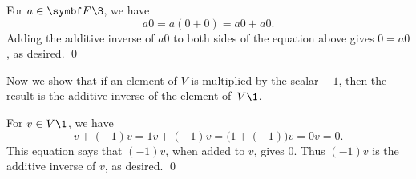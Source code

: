 
\proof
For $a \in \F{}\3$, we have
\[
a0 = a(0 + 0) = a0 + a0.
\]
Adding the additive inverse of $a0$ to both sides of the equation above gives
$0 = a0$, as desired.
\qed

Now we show that if an element of $V$ is multiplied by the
scalar~$-1$, then the result is the
additive inverse of the element of~$V\1$.


\proof
For $v \in V\1$, we have
\[
v + (-1)v = 1v + (-1)v = \bigl(1 + (-1)\bigr)v = 0v = 0.
\]
This equation says that $(-1)v$, when added to $v$, gives $0$.  Thus
$(-1)v$ is the additive inverse of $v$, as desired.
\qed

